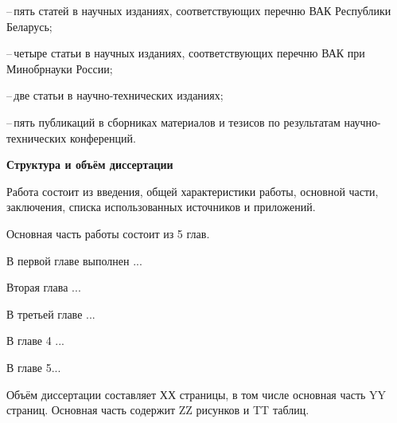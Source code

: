 --\,пять статей в научных изданиях, соответствующих перечню ВАК Республики Беларусь;

--\,четыре статьи в научных изданиях, соответствующих перечню ВАК при Минобрнауки России;

--\,две статьи в научно-технических изданиях;

--\,пять публикаций в сборниках материалов и тезисов по результатам научно-технических конференций.


\textbf{Структура и объём диссертации}


Работа состоит из введения, общей характеристики работы, основной части, заключения,
списка использованных источников и приложений.

Основная часть работы состоит из 5 глав.

В первой главе выполнен ...

Вторая глава ...


В третьей главе ...


В главе 4 ...

В главе 5...


Объём диссертации составляет ХХ страницы, в том числе основная часть YY страниц.
Основная часть содержит ZZ рисунков и TT таблиц.
